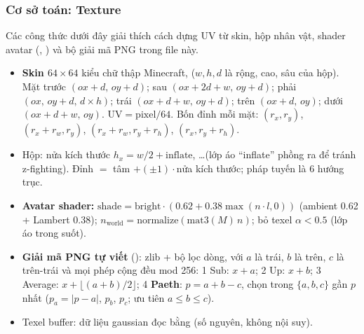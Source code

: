 \subsubsection{Cơ sở toán: Texture}\label{s:texture}
Các công thức dưới đây giải thích cách dựng UV từ skin, hộp nhân vật, shader avatar (, ) và bộ giải mã PNG  trong file này.
\begin{itemize}
\item \textbf{Skin $64\times64$} kiểu chữ thập Minecraft,  ($w,h,d$ là rộng, cao, sâu của hộp). Mặt trước $(ox+d,\,oy+d)$; sau $(ox+2d+w,\,oy+d)$; phải $(ox,\,oy+d,\,d\times h)$; trái $(ox+d+w,\,oy+d)$; trên $(ox+d,\,oy)$; dưới $(ox+d+w,\,oy)$. $\mathrm{UV}=\mathrm{pixel}/64$. Bốn đỉnh mỗi mặt: $(r_x,r_y)$, $(r_x+r_w,r_y)$, $(r_x+r_w,r_y+r_h)$, $(r_x,r_y+r_h)$.
\item Hộp: nửa kích thước $h_x=w/2+\mathrm{inflate}$, \ldots (lớp áo ``inflate'' phồng ra để tránh z-fighting). Đỉnh $=$ tâm $+(\pm1)\cdot$nửa kích thước; pháp tuyến là 6 hướng trục.
\item \textbf{Avatar shader:} $\mathrm{shade}=\mathrm{bright}\cdot(0.62+0.38\max(n\cdot l,0))$ (ambient 0.62 + Lambert 0.38); $n_{\mathrm{world}}=\mathrm{normalize}(\mathrm{mat3}(M)\,n)$; bỏ texel $\alpha<0.5$ (lớp áo trong suốt).
\item \textbf{Giải mã PNG tự viết} (): zlib + bộ lọc dòng, với $a$ là trái, $b$ là trên, $c$ là trên-trái và mọi phép cộng đều mod 256: 1 Sub: $x+a$; 2 Up: $x+b$; 3 Average: $x+\lfloor(a+b)/2\rfloor$; 4 \textbf{Paeth}: $p=a+b-c$, chọn trong $\{a,b,c\}$ gần $p$ nhất ($p_a=|p-a|$, $p_b$, $p_c$; ưu tiên $a\le b\le c$).
\item Texel buffer: dữ liệu gaussian đọc bằng  (số nguyên, không nội suy).
\end{itemize}
